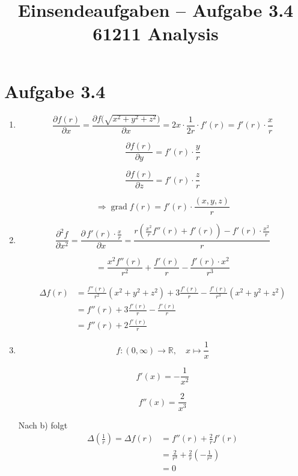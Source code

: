 \documentclass[a4paper,12pt]{article}
\title{Einsendeaufgaben -- Aufgabe 3.4\\[0.5em]
\large 61211 Analysis}
\author{}
\date{}
\begin{document}
\maketitle

\section*{Aufgabe 3.4}

\begin{enumerate}[label=\alph*)]

    \item
          \[
              \frac{\partial f(r)}{\partial x} = \frac{\partial f\bigl(\sqrt{x^2+y^2+z^2}\bigr)}{\partial x} = 2x \cdot \frac{1}{2r} \cdot f'(r) = f'(r) \cdot \frac{x}{r}
          \]

          \[
              \frac{\partial f(r)}{\partial y} = f'(r) \cdot \frac{y}{r}
          \]

          \[
              \frac{\partial f(r)}{\partial z} = f'(r) \cdot \frac{z}{r}
          \]

          \[
              \Rightarrow \operatorname{grad} f(r) = f'(r) \cdot \frac{(x,y,z)}{r}
          \]

    \item
          \[
              \frac{\partial^2 f}{\partial x^2} = \frac{\partial \, f'(r) \cdot \frac{x}{r}}{\partial x} = \frac{r \left( \frac{x^2}{r} f''(r) + f'(r) \right) - f'(r) \cdot \frac{x^2}{r}}{r}
          \]

          \[
              = \frac{x^2 f''(r)}{r^2} + \frac{f'(r)}{r} - \frac{f'(r) \cdot x^2}{r^3}
          \]

          \begin{align*}
              \Delta f(r) & = \frac{f''(r)}{r^2} (x^2+y^2+z^2) + 3 \frac{f'(r)}{r} - \frac{f'(r)}{r^3} (x^2+y^2+z^2) \\
                          & = f''(r) + 3 \frac{f'(r)}{r} - \frac{f'(r)}{r}                                          \\
                          & = f''(r) + 2 \frac{f'(r)}{r}
          \end{align*}

    \item
          \[
              f : (0, \infty) \to \mathbb{R}, \quad x \mapsto \frac{1}{x}
          \]

          \[
              f'(x) = -\frac{1}{x^2}
          \]

          \[
              f''(x) = \frac{2}{x^3}
          \]

          Nach b) folgt
          \begin{align*}
              \Delta\left(\frac{1}{r}\right) = \Delta f(r) & = f''(r) + \frac{2}{r} f'(r)                       \\
                                                           & = \frac{2}{r^3} + \frac{2}{r} \left(-\frac{1}{r^2}\right) \\
                                                           & = 0
          \end{align*}

\end{enumerate}
\end{document}
